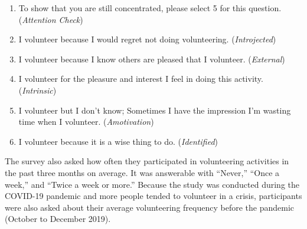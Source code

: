 \begin{enumerate}
    \item To show that you are still concentrated, please select 5 for this question. (\textit{Attention Check})
    \item I volunteer because I would regret not doing volunteering. (\textit{Introjected})
    \item I volunteer because I know others are pleased that I volunteer. (\textit{External})
    \item I volunteer for the pleasure and interest I feel in doing this activity. (\textit{Intrinsic})
    \item I volunteer but I don't know; Sometimes I have the impression I'm wasting time when I volunteer. (\textit{Amotivation})
    \item I volunteer because it is a wise thing to do. (\textit{Identified})
\end{enumerate}

The survey also asked how often they participated in volunteering activities in the past three months on average. It was answerable with ``Never,'' ``Once a week,'' and ``Twice a week or more.'' Because the study was conducted during the COVID-19 pandemic and more people tended to volunteer in a crisis, participants were also asked about their average volunteering frequency before the pandemic (October to December 2019).